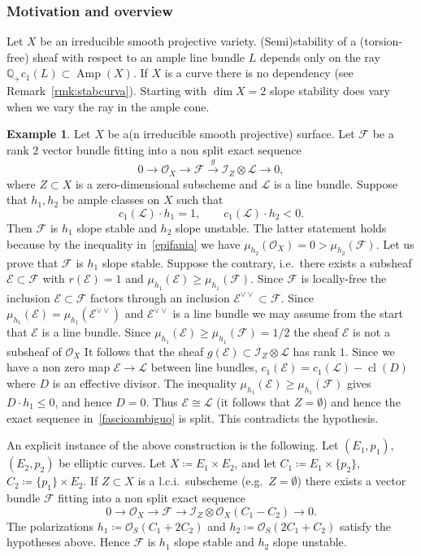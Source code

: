 \documentclass[11pt]{amsart}
\newcommand{\QQ}{{\mathbb Q}}
\let\mathcal\mathscr
\def\cE{\mathcal{E}}
\def\cF{\mathcal{F}}
\def\cI{\mathcal{I}}
\def\cL{\mathcal{L}}
\def\cO{\mathcal{O}}
\DeclareMathOperator{\Amp}{Amp}
\DeclareMathOperator{\cl}{cl}
\newcommand{\es}{{\emptyset}}
\def\lra{\longrightarrow}
\theoremstyle{definition}
\newtheorem{expl}[lmm]{Example}
\theoremstyle{remark}
\begin{document}
\subsubsection{Motivation and overview}
%
Let $X$ be an irreducible smooth projective variety. (Semi)stability of a (torsion-free) sheaf with respect to an ample line bundle $L$  depends  only on the ray $\QQ_{+} c_1(L)\subset \Amp(X)$. If $X$ is a curve there is no dependency (see Remark~\ref{rmk:stabcurva}). Starting with $\dim X=2$ slope stability  does vary when we vary  the ray in the ample cone.
%
\begin{expl}
%
Let $X$ be a(n irreducible smooth projective) surface. Let $\cF$ be a rank $2$ vector bundle fitting into a non split exact sequence
%
\begin{equation}\label{fascioambiguo}
%
0\lra \cO_X\lra \cF\overset{g}{\lra} \cI_Z\otimes \cL\lra 0,
%
\end{equation}
%
where $Z\subset X$ is a zero-dimensional subscheme and $\cL$ is a line bundle. Suppose that $h_1,h_2$ be ample classes on $X$  such that
%
\begin{equation}\label{epifania}
%
 c_1(\cL)\cdot h_1=1,\qquad  c_1(\cL)\cdot h_2<0.
%
\end{equation}
%
 Then $\cF$ is $h_1$ slope stable and $h_2$ slope unstable. The latter statement holds because by the inequality in~\eqref{epifania} we have 
 $\mu_{h_2}(\cO_X)=0>\mu_{h_2}(\cF)$. Let us prove that  $\cF$ is $h_1$ slope stable. Suppose the contrary, i.e.~there exists a subsheaf $\cE\subset\cF$ with $r(\cE)=1$ and $\mu_{h_1}(\cE)\ge \mu_{h_1}(\cF)$. Since $\cF$ is locally-free the inclusion $\cE\subset\cF$ factors through an inclusion 
 $\cE^{\vee\vee}\subset\cF$. Since $\mu_{h_1}(\cE)=\mu_{h_1}(\cE^{\vee\vee})$ and $\cE^{\vee\vee}$ is a line bundle we may assume 
from the start  that $\cE$ is a line bundle. Since $\mu_{h_1}(\cE)\ge \mu_{h_1}(\cF)=1/2$ the sheaf $\cE$ is not a subsheaf of 
 $\cO_X$ It follows that
the sheaf 
$g(\cE)\subset \cI_Z\otimes \cL$ has rank $1$.  Since we have a non zero map $\cE\to\cL$ between line bundles,  $c_1(\cE)=c_1(\cL)-\cl(D)$ where $D$ is an effective divisor. The inequality $\mu_{h_1}(\cE)\ge  \mu_{h_1}(\cF)$ gives
$D\cdot h_1\le 0$, and hence $D=0$. Thus $\cE\cong\cL$ (it follows that 
 $Z=\es$) and  hence  the exact sequence in~\eqref{fascioambiguo} is 
split. This contradicts the hypothesis.

An explicit instance of the above construction is the following. Let $(E_1,p_1)$, $(E_2,p_2)$ be  elliptic curves. Let $X\coloneqq E_1\times E_2$, and let $C_1\coloneqq E_1\times\{p_2\}$, 
$C_2\coloneqq \{p_1\}\times E_2$. If $Z\subset X$ is a l.c.i.~subscheme (e.g.~$Z=\es$) 
 there exists a vector bundle $\cF$ fitting into a non split exact sequence
%
\begin{equation}\label{magicest}
%
0\lra\cO_X\lra\cF\lra \cI_Z\otimes\cO_X(C_1-C_2)\lra 0.
%
\end{equation}
%
The polarizations $h_1\coloneqq \cO_S(C_1+2C_2)$ and $h_2\coloneqq \cO_S(2C_1+C_2)$ satisfy the hypotheses above. Hence $\cF$ is $h_1$ slope stable and $h_2$ slope unstable.
%
\end{expl}
\end{document}
